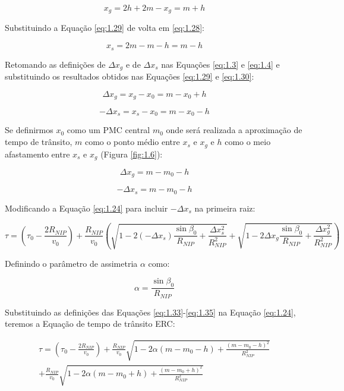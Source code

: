\documentclass[a4paper, 12pt]{article}
\begin{document}
\begin{equation}
 \label{eq:1.29}
 x_g = 2h + 2m - x_g = m + h
\end{equation}

Substituindo a Equação \ref{eq:1.29} de volta em \ref{eq:1.28}:

\begin{equation}
 \label{eq:1.30}
 x_s = 2m - m -h = m - h
\end{equation}

Retomando as definições de $\Delta x_g$ e de $\Delta x_s$ nas Equações \ref{eq:1.3} e \ref{eq:1.4}
e substituindo os resultados obtidos nas Equações \ref{eq:1.29} e \ref{eq:1.30}:

\begin{equation}
 \label{eq:1.31}
 \Delta x_g = x_g - x_0 = m - x_0 + h
\end{equation}

\begin{equation}
 \label{eq:1.32}
 - \Delta x_s = x_s - x_0 = m - x_0 - h
\end{equation}

Se definirmos $x_0$ como um PMC central $m_0$ onde será realizada a aproximação de tempo de trânsito,
$m$ como o ponto médio entre $x_s$ e $x_g$ e $h$ como o meio afastamento entre $x_s$ e $x_g$ (Figura \ref{fig:1.6}):

\begin{equation}
 \label{eq:1.33}
 \Delta x_g = m - m_0 - h
\end{equation}

\begin{equation}
 \label{eq:1.34}
 - \Delta x_s = m - m_0 - h
\end{equation}

Modificando a Equação \ref{eq:1.24} para incluir $-\Delta x_s$ na primeira raiz:

\begin{equation}
 \label{eq:1.35}
\tau = \left( \tau_0 - \frac{2 R_{NIP}}{v_0} \right)
+ \frac{R_{NIP}}{v_0} \left( \sqrt{  1 - 2 (-\Delta x_s) \frac{\sin{\beta_0}}{R_{NIP}} + \frac{\Delta x_{s}^2}{R_{NIP}^2} }
+ \sqrt{  1 - 2 \Delta x_g \frac{\sin{\beta_0}}{R_{NIP}} + \frac{\Delta x_{g}^2}{R_{NIP}^2} } \right)
\end{equation}

Definindo o parâmetro de assimetria $\alpha$ como:

\begin{equation}
 \label{eq:1.36}
 \alpha = \frac{\sin \beta_0}{R_{NIP}}
\end{equation}

Substituindo as definições das Equações \ref{eq:1.33}-\ref{eq:1.35} na
Equação \ref{eq:1.24}, teremos a Equação de tempo de trânsito ERC:

\begin{multline}
 \label{eq:1.37}
\tau = \left( \tau_0 - \frac{2 R_{NIP}}{v_0} \right)
+ \frac{R_{NIP}}{v_0} \sqrt{  1 - 2 \alpha (m - m_0 - h) + \frac{(m - m_0 - h)^2}{R_{NIP}^2} } \\
+ \frac{R_{NIP}}{v_0}  \sqrt{  1 - 2 \alpha (m - m_0 + h) + \frac{(m - m_0 + h)^2}{R_{NIP}^2} }
\end{multline}
\end{document}
